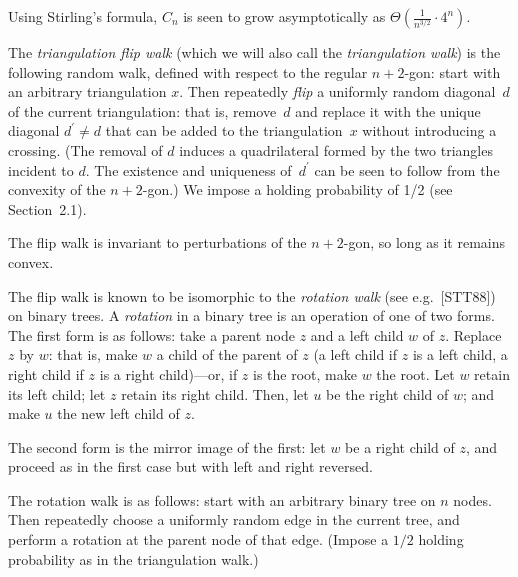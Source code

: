 \documentclass[10pt,a4paper]{article}
\begin{document}
Using Stirling’s formula, $C_{n}$ is seen to grow asymptotically as $\Theta\left(\frac{1}{n^{3/2}}\cdot 4^{n}\right)$.\par




The \emph{triangulation flip walk} (which we will also call the \emph{triangulation walk}) is the following random walk, defined with respect to the regular $n+2$-gon: start with an arbitrary triangulation $x$. Then repeatedly \emph{flip} a uniformly random diagonal $d$ of the current triangulation: that is, remove $d$ and replace it with the unique diagonal $d^{\prime}\neq d$ that can be added to the triangulation $x$ without introducing a crossing. (The removal of $d$ induces a quadrilateral formed by the two triangles incident to $d$. The existence and uniqueness of $d^{\prime}$ can be seen to follow from the convexity of the $n+2$-gon.) We impose a holding probability of 1/2 (see Section 2.1).\par




The flip walk is invariant to perturbations of the $n+2$-gon, so long as it remains convex.\par




The flip walk is known to be isomorphic to the \emph{rotation walk} (see e.g. [STT88]) on binary trees. A \emph{rotation} in a binary tree is an operation of one of two forms. The first form is as follows: take a parent node $z$ and a left child $w$ of $z$. Replace $z$ by $w$: that is, make $w$ a child of the parent of $z$ (a left child if $z$ is a left child, a right child if $z$ is a right child)—or, if $z$ is the root, make $w$ the root. Let $w$ retain its left child; let $z$ retain its right child. Then, let $u$ be the right child of $w$; and make $u$ the new left child of $z$.\par




The second form is the mirror image of the first: let $w$ be a right child of $z$, and proceed as in the first case but with left and right reversed.\par




The rotation walk is as follows: start with an arbitrary binary tree on $n$ nodes. Then repeatedly choose a uniformly random edge in the current tree, and perform a rotation at the parent node of that edge. (Impose a $1/2$ holding probability as in the triangulation walk.)\par
\end{document}
